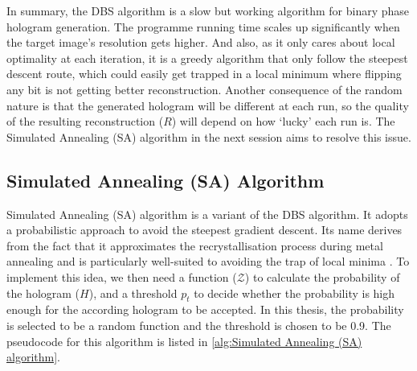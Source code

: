 In summary, the DBS algorithm is a slow but working algorithm for binary phase hologram generation. The programme running time scales up significantly when the target image's resolution gets higher. And also, as it only cares about local optimality at each iteration, it is a greedy algorithm that only follow the steepest descent route, which could easily get trapped in a local minimum where flipping any bit is not getting better reconstruction. Another consequence of the random nature is that the generated hologram will be different at each run, so the quality of the resulting reconstruction ($R$) will depend on how `lucky' each run is. The Simulated Annealing (SA) algorithm \cite{Kirkpatrick1983} in the next session aims to resolve this issue.


\subsection{Simulated Annealing (SA) Algorithm}\label{sec:Simulated Annealing (SA) Algorithm}
Simulated Annealing (SA) algorithm \cite{Kirkpatrick1983} is a variant of the DBS algorithm. It adopts a probabilistic approach to avoid the steepest gradient descent. Its name derives from the fact that it approximates the recrystallisation process during metal annealing and is particularly well-suited to avoiding the trap of local minima \cite{Yang2009}. To implement this idea, we then need a function ($\mathcal{Z}$) to calculate the probability of the hologram ($H$), and a threshold $p_t$ to decide whether the probability is high enough for the according hologram to be accepted. In this thesis, the probability is selected to be a random function and the threshold is chosen to be 0.9. The pseudocode for this algorithm is listed in \cref{alg:Simulated Annealing (SA) algorithm}.
